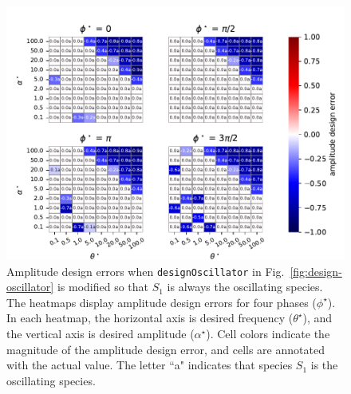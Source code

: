 \documentclass{bmcart}
\newcommand{\fig}[1]{Fig.~\ref{#1}}
\begin{document}
\begin{backmatter}
\begin{figure}
        \centering
\includegraphics[scale=0.75]{figures/evaluation_plot_alphadev_x1.pdf}
         \caption[]{Amplitude design errors when {\tt designOscillator} in \fig{fig:design-oscillator} is modified so that $S_1$ is always the oscillating species. The heatmaps display amplitude design errors for four phases ($\phi^{\star}$). In each heatmap, the horizontal axis is desired frequency ($\theta^{\star}$), and the vertical axis is desired amplitude ($\alpha^{\star}$). Cell colors indicate the magnitude of the amplitude design error, and cells are annotated with the actual value. The letter ``a" indicates that species $S_1$ is the oscillating species.} 
         \label{fig:amplitude-design-error-x1}
\end{figure}



\end{backmatter}
\end{document}
